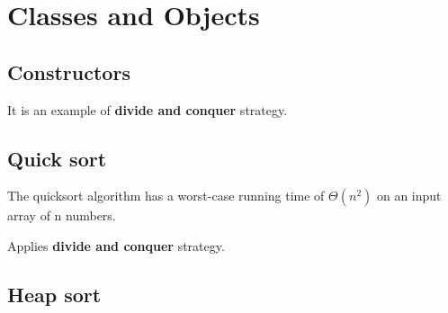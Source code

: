 \chapter{Classes and Objects}
\section{Constructors}

It is an example of \textbf{divide and conquer} strategy.

\section{Quick sort}
The quicksort algorithm has a worst-case running time of $\Theta(n^{2})$ on an input array of n numbers.

Applies \textbf{divide and conquer} strategy.

\section{Heap sort}